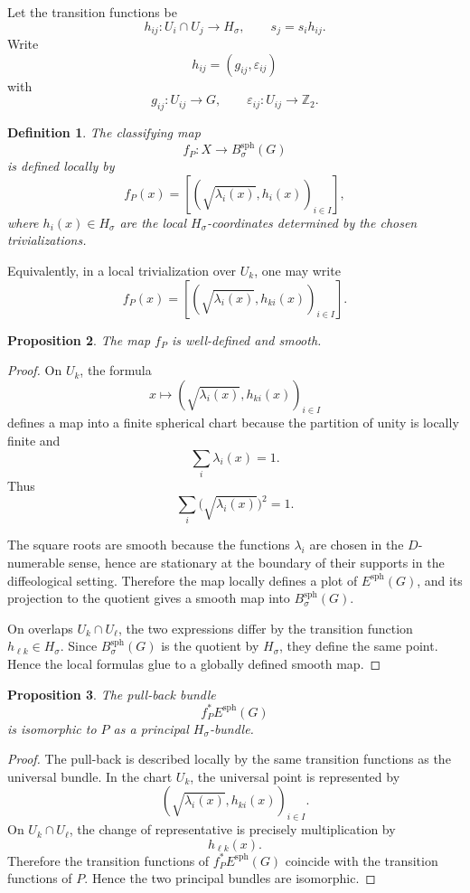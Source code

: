 \documentclass[11pt]{amsart}
\newtheorem{definition}{Definition}[section]
\newtheorem{proposition}[definition]{Proposition}
\begin{document}
Let the transition functions be
\[
h_{ij}:U_i\cap U_j\to H_\sigma,
\qquad
s_j=s_i h_{ij}.
\]
Write
\[
h_{ij}=(g_{ij},\varepsilon_{ij})
\]
with
\[
g_{ij}:U_{ij}\to G,
\qquad
\varepsilon_{ij}:U_{ij}\to \mathbb Z_2.
\]

\begin{definition}
The classifying map
\[
f_P:X\longrightarrow B^{\mathrm{sph}}_\sigma(G)
\]
is defined locally by
\[
f_P(x)
=
\left[
\left(\sqrt{\lambda_i(x)},h_i(x)\right)_{i\in I}
\right],
\]
where \(h_i(x)\in H_\sigma\) are the local \(H_\sigma\)-coordinates determined by the chosen trivializations.
\end{definition}

Equivalently, in a local trivialization over \(U_k\), one may write
\[
f_P(x)
=
\left[
\left(\sqrt{\lambda_i(x)},h_{ki}(x)\right)_{i\in I}
\right].
\]

\begin{proposition}
The map \(f_P\) is well-defined and smooth.
\end{proposition}

\begin{proof}
On \(U_k\), the formula
\[
x\longmapsto
\left(\sqrt{\lambda_i(x)},h_{ki}(x)\right)_{i\in I}
\]
defines a map into a finite spherical chart because the partition of unity is locally finite and
\[
\sum_i \lambda_i(x)=1.
\]
Thus
\[
\sum_i \bigl(\sqrt{\lambda_i(x)}\bigr)^2=1.
\]

The square roots are smooth because the functions \(\lambda_i\) are chosen in the \(D\)-numerable sense, hence are stationary at the boundary of their supports in the diffeological setting. Therefore the map locally defines a plot of \(E^{\mathrm{sph}}(G)\), and its projection to the quotient gives a smooth map into \(B^{\mathrm{sph}}_\sigma(G)\).

On overlaps \(U_k\cap U_\ell\), the two expressions differ by the transition function \(h_{\ell k}\in H_\sigma\). Since \(B^{\mathrm{sph}}_\sigma(G)\) is the quotient by \(H_\sigma\), they define the same point. Hence the local formulas glue to a globally defined smooth map.
\end{proof}

\begin{proposition}
The pull-back bundle
\[
f_P^*E^{\mathrm{sph}}(G)
\]
is isomorphic to \(P\) as a principal \(H_\sigma\)-bundle.
\end{proposition}

\begin{proof}
The pull-back is described locally by the same transition functions as the universal bundle. In the chart \(U_k\), the universal point is represented by
\[
\left(\sqrt{\lambda_i(x)},h_{ki}(x)\right)_{i\in I}.
\]
On \(U_k\cap U_\ell\), the change of representative is precisely multiplication by
\[
h_{\ell k}(x).
\]
Therefore the transition functions of \(f_P^*E^{\mathrm{sph}}(G)\) coincide with the transition functions of \(P\). Hence the two principal bundles are isomorphic.
\end{proof}
\end{document}
